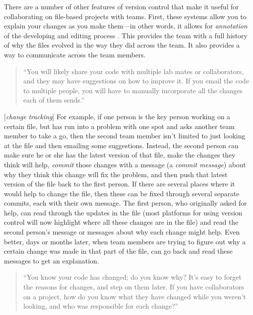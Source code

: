 \documentclass[]{tufte-book}
\begin{document}
There are a number of other features of version control that make it useful for
collaborating on file-based projects with teams. First, these systems allow you
to explain your changes as you make them---in other words, it allows for
\emph{annotation} of the developing and editing process \citep{raymondunderstanding}. This
provides the team with a full history of why the files evolved in the way they
did across the team. It also provides a way to communicate across the team
members.

\begin{quote}
``You will likely share your code with multiple lab mates or collaborators,
and they may have suggestions on how to improve it. If you email the code
to multiple people, you will have to manually incorporate all the changes
each of them sends.'' \citep{blischak2016quick}
\end{quote}

{[}\emph{change tracking}{]}
For example, if one person is the key person working on a certain file,
but has run into a problem with one spot and asks another team member to take a
go, then the second team member isn't limited to just looking at the file and
then emailing some suggestions. Instead, the second person can make sure he or
she has the latest version of that file, make the changes they think will help,
\emph{commit} those changes with a message (a \emph{commit message}) about why they think
this change will fix the problem, and then push that latest version of the file
back to the first person. If there are several places where it would help to
change the file, then these can be fixed through several separate commits, each
with their own message. The first person, who originally asked for help, can
read through the updates in the file (most platforms for using version control
will now highlight where all these changes are in the file) and read the second
person's message or messages about why each change might help. Even better, days
or months later, when team members are trying to figure out why a certain change
was made in that part of the file, can go back and read these messages to get an
explanation.

\begin{quote}
``You know your code has changed; do you know why? It's easy to forget the
reasons for changes, and step on them later. If you have collaborators on a
project, how do you know what they have changed while you weren't looking, and
who was responsible for each change?'' \citep{raymond2003art}
\end{quote}
\end{document}
